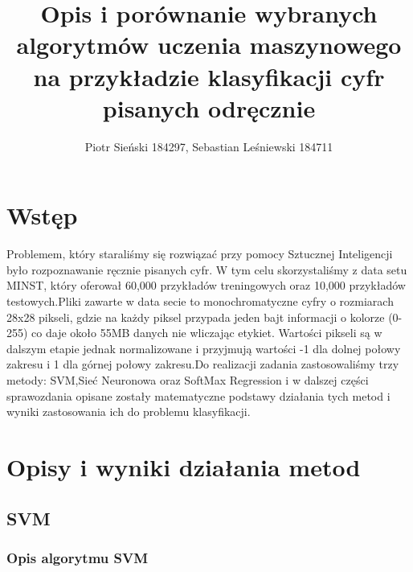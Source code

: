 \documentclass[11pt]{article}
\title{Opis i porównanie wybranych algorytmów uczenia maszynowego na przykładzie klasyfikacji cyfr pisanych odręcznie}
\author{Piotr Sieński 184297, Sebastian Leśniewski 184711}
\begin{document}
    
    \maketitle
    
    

    
    \hypertarget{wstux119p}{%
\section{Wstęp}\label{wstux119p}}

Problemem, który staraliśmy się rozwiązać przy pomocy Sztucznej
Inteligencji było rozpoznawanie ręcznie pisanych cyfr. W tym celu
skorzystaliśmy z data setu MINST, który oferował 60,000 przykładów
treningowych oraz 10,000 przykładów testowych.Pliki zawarte w data secie
to monochromatyczne cyfry o rozmiarach 28x28 pikseli, gdzie na każdy
piksel przypada jeden bajt informacji o kolorze (0-255) co daje około
55MB danych nie wliczając etykiet. Wartości pikseli są w dalszym etapie
jednak normalizowane i przyjmują wartości -1 dla dolnej połowy zakresu i
1 dla górnej połowy zakresu.Do realizacji zadania zastosowaliśmy trzy
metody: SVM,Sieć Neuronowa oraz SoftMax Regression i w dalszej części
sprawozdania opisane zostały matematyczne podstawy działania tych metod
i wyniki zastosowania ich do problemu klasyfikacji.

\hypertarget{opisy-i-wyniki-dziaux142ania-metod}{%
\section{Opisy i wyniki działania
metod}\label{opisy-i-wyniki-dziaux142ania-metod}}

\hypertarget{svm}{%
\subsection{SVM}\label{svm}}

\hypertarget{opis-algorytmu-svm}{%
\subsubsection{Opis algorytmu SVM}\label{opis-algorytmu-svm}}
\end{document}
